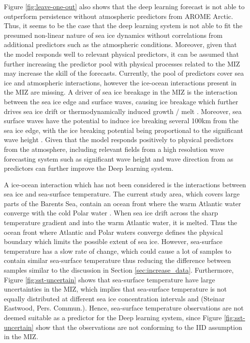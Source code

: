 \documentclass[../main/thesis]{subfiles}
\begin{document}
Figure \ref{fig:leave-one-out} also shows that the deep learning forecast is not able to outperform persistence without atmospheric predictors from AROME Arctic. Thus, it seems to be the case that the deep learning system is not able to fit the presumed non-linear nature of sea ice dynamics \citep{Grigoryev2022} without correlations from additional predictors such as the atmospheric conditions. Moreover, given that the model responds well to relevant physical predictors, it can be assumed that further increasing the predictor pool with physical processes related to the MIZ may increase the skill of the forecasts. Currently, the pool of predictors cover sea ice and atmospheric interactions, however the ice-ocean interactions present in the MIZ are missing. A driver of sea ice breakage in the MIZ is the interaction between the sea ice edge and surface waves, causing ice breakage which further drives sea ice drift or thermodynamically induced growth / melt \citep{Williams2013}. Moreover, sea surface waves have the potential to induce ice breaking several 100km from the sea ice edge, with the ice breaking potential being proportional to the significant wave height \citep{Kohout2014}. Given that the model responds positively to physical predictors from the atmosphere, including relevant fields from a high resolution wave forecasting system such as significant wave height and wave direction from \citet{Carrasco2022} as predictors can further improve the Deep learning system. 
 
A ice-ocean interaction which has not been considered is the interactions between sea ice and sea-surface temperature. The current study area, which covers large parts of the Barents Sea, contain an ocean front where the warm Atlantic water converge with the cold Polar water \citep{Johannessen1978}. When sea ice drift across the sharp temperature gradient and into the warm Atlantic water, it is melted. Thus the ocean front where Atlantic and Polar waters converge defines the physical boundary which limits the possible extent of sea ice. However, sea-surface temperature has a slow rate of change, which could cause a lot of samples to contain similar sea-surface temperature thus reducing the difference between samples similar to the discussion in Section \ref{sec:increase_data}. Furthermore, Figure \ref{fig:sst-uncertain} shows that sea-surface temperature have large uncertainties in the MIZ, which implies that sea-surface temperature is not equally distributed at different sea ice concentration intervals \citep{Castro2023} and (Steinar Eastwood, Pers. Commun.). Hence, sea-surface temperature observations are not deemed suitable as a predictor for the Deep learning system, since Figure \ref{fig:sst-uncertain} show that the observations are not conforming to the IID assumption in the MIZ.
\end{document}
